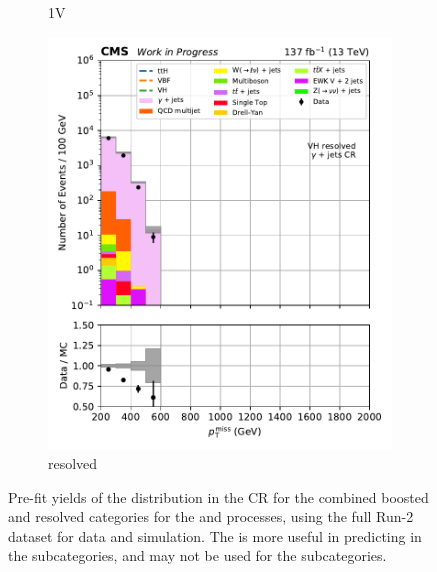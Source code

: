 \begin{figure}[htbp]
\begin{subfigure}[b]{0.24\textwidth}
        \caption{\VH 1V}
    \end{subfigure}
    \hfill
    \begin{subfigure}[b]{0.24\textwidth}
        \includegraphics[width=\textwidth]{figures/region_plots/full_Run2/region_5/VH_resolved.pdf}
        \caption{\VH resolved}
    \end{subfigure}
    \caption[Pre-fit yields of the \ptmiss distribution in the \singlePhotonCr control region for the combined boosted and resolved categories for the \ttH and \VH processes, using the full Run-2 dataset for data and simulation]{Pre-fit yields of the \ptmiss distribution in the \singlePhotonCr \gls{CR} for the combined boosted and resolved categories for the \ttH and \VH processes, using the full Run-2 dataset for data and simulation. The \singlePhotonCr is more useful in predicting \ztonunupjets in the \VH subcategories, and may not be used for the \ttH subcategories.}
    \label{fig:htoinv_cr_yields_comb2016to18_single_photon}
\end{figure}



